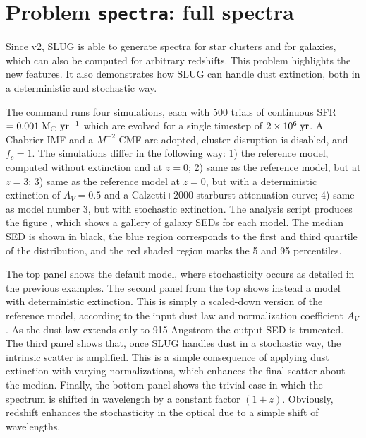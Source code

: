 \documentclass[letterpaper,10pt,english]{sphinxmanual}
\begin{document}
\section{Problem \texttt{spectra}: full spectra}
\label{tests:problem-spectra-full-spectra}
Since v2, SLUG is able to generate spectra for star clusters and for galaxies, which can also be computed for
arbitrary redshifts. This problem highlights the new features.
It also demonstrates how SLUG can handle dust extinction, both in a deterministic and stochastic way.

The command   runs four  simulations, each with 500 trials
of continuous SFR \(=0.001\rm\;M_\odot\;yr^{-1}\) which are evolved for a
single timestep of  \(2\times 10^6\rm\;yr\). A Chabrier IMF and a \(M^{-2}\)
CMF are adopted, cluster disruption is disabled, and \(f_c = 1\).
The simulations differ in the following way:
1) the reference model, computed without extinction and at \(z = 0\);
2) same as the reference model, but at \(z = 3\);
3) same as the reference model at \(z = 0\), but with a deterministic extinction of \(A_V = 0.5\) and
a Calzetti+2000 starburst attenuation curve;
4) same as model number 3, but with stochastic extinction.
The analysis script  produces the figure ,
which shows a gallery of galaxy SEDs for each model. The median SED is shown in black, the blue region
corresponds to the first and third quartile of the distribution, and the red shaded region
marks the 5 and 95 percentiles.

The top panel shows the default model, where stochasticity occurs as detailed in the previous examples.
The second panel from the top shows instead a model with deterministic extinction. This is simply
a scaled-down version of the reference model, according to the input dust law and normalization
coefficient \(A_V\). As the dust law extends only to 915 Angstrom the output SED is truncated.
The third panel shows that, once SLUG handles dust  in a stochastic way, the intrinsic scatter is
amplified. This is a simple consequence of applying dust extinction with varying normalizations, which
enhances the final scatter about the median. Finally, the bottom panel shows the trivial case in which
the spectrum is shifted in wavelength by a constant factor \((1+z)\). Obviously, redshift enhances
the stochasticity in the optical due to a simple shift of wavelengths.
\end{document}
